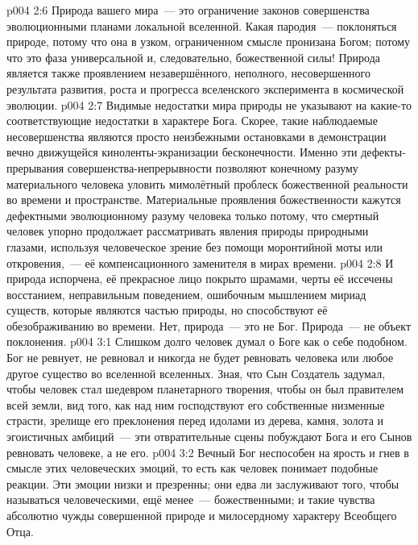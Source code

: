 \vs p004 2:6 Природа вашего мира~--- это ограничение законов совершенства эволюционными планами локальной вселенной. Какая пародия~--- поклоняться природе, потому что она в узком, ограниченном смысле пронизана Богом; потому что это фаза универсальной и, следовательно, божественной силы! Природа является также проявлением незавершённого, неполного, несовершенного результата развития, роста и прогресса вселенского эксперимента в космической эволюции.
\vs p004 2:7 Видимые недостатки мира природы не указывают на какие\hyp{}то соответствующие недостатки в характере Бога. Скорее, такие наблюдаемые несовершенства являются просто неизбежными остановками в демонстрации вечно движущейся киноленты\hyp{}экранизации бесконечности. Именно эти дефекты\hyp{}прерывания совершенства\hyp{}непрерывности позволяют конечному разуму материального человека уловить мимолётный проблеск божественной реальности во времени и пространстве. Материальные проявления божественности кажутся дефектными эволюционному разуму человека только потому, что смертный человек упорно продолжает рассматривать явления природы природными глазами, используя человеческое зрение без помощи моронтийной моты или откровения,~--- её компенсационного заменителя в мирах времени.
\vs p004 2:8 И природа испорчена, её прекрасное лицо покрыто шрамами, черты её иссечены восстанием, неправильным поведением, ошибочным мышлением мириад существ, которые являются частью природы, но способствуют её обезображиванию во времени. Нет, природа~--- это не Бог. Природа~--- не объект поклонения.
\vs p004 3:1 Слишком долго человек думал о Боге как о себе подобном. Бог не ревнует, не ревновал и никогда не будет ревновать человека или любое другое существо во вселенной вселенных. Зная, что Сын Создатель задумал, чтобы человек стал шедевром планетарного творения, чтобы он был правителем всей земли, вид того, как над ним господствуют его собственные низменные страсти, зрелище его преклонения перед идолами из дерева, камня, золота и эгоистичных амбиций~--- эти отвратительные сцены побуждают Бога и его Сынов ревновать  человеке, а не его.
\vs p004 3:2 Вечный Бог неспособен на ярость и гнев в смысле этих человеческих эмоций, то есть как человек понимает подобные реакции. Эти эмоции низки и презренны; они едва ли заслуживают того, чтобы называться человеческими, ещё менее~--- божественными; и такие чувства абсолютно чужды совершенной природе и милосердному характеру Всеобщего Отца.
